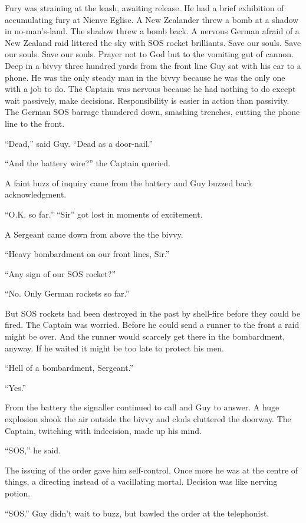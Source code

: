 Fury was straining at the leash, awaiting release. He had a brief exhibition of accumulating fury at Nienve Eglise. A New Zealander threw a bomb at a shadow in no-man's-land. The shadow threw a bomb back. A nervous German afraid of a New Zealand raid littered the sky with SOS rocket brilliants. Save our souls. Save our souls. Save our souls. Prayer not to God but to the vomiting gut of cannon. Deep in a bivvy three hundred yards from the front line Guy sat with his ear to a phone. He was the only steady man in the bivvy because he was the only one with a job to do. The Captain was nervous because he had nothing to do except wait passively, make decisions. Responsibility is easier in action than passivity. The German SOS barrage thundered down, smashing trenches, cutting the phone line to the front.

``Dead,'' said Guy. ``Dead as a door-nail.''

``And the battery wire?'' the Captain queried.

A faint buzz of inquiry came from the battery and Guy buzzed back acknowledgment.

``O.K. so far.'' ``Sir'' got lost in moments of excitement.

A Sergeant came down from above the the bivvy.

``Heavy bombardment on our front lines, Sir.''

``Any sign of our SOS rocket?''

``No. Only German rockets so far.''

But SOS rockets had been destroyed in the past by shell-fire before they could be fired. The Captain was worried. Before he could send a runner to the front a raid might be over. And the runner would scarcely get there in the bombardment, anyway. If he waited it might be too late to protect his men.

``Hell of a bombardment, Sergeant.''

``Yes.''

From the battery the signaller continued to call and Guy to answer. A huge explosion shook the air outside the bivvy and clods cluttered the doorway. The Captain, twitching with indecision, made up his mind.

``SOS,'' he said.

The issuing of the order gave him self-control. Once more he was at the centre of things, a directing instead of a vacillating mortal. Decision was like nerving potion.

``SOS.'' Guy didn't wait to buzz, but bawled the order at the telephonist.

